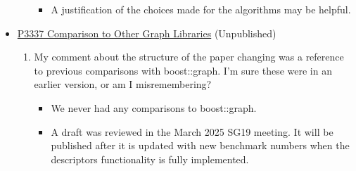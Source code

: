 \begin{itemize}
\begin{enumerate}
\begin{itemize}
\begin{itemize}
                                    \end{itemize}
                              \item A justification of the choices made for the algorithms may be helpful.
                  \end{itemize}
            \end{enumerate}
      \item \href{https://www.wg21.link/P3337}{P3337 Comparison to Other Graph Libraries} (Unpublished)
            \begin{enumerate}
                  \item My comment about the structure of the paper changing was a reference to previous comparisons with boost::graph. 
                        I'm sure these were in an earlier version, or am I misremembering?
                  \begin{itemize}
                        \item We never had any comparisons to boost::graph. 
                        \item A draft was reviewed in the March 2025 SG19 meeting. It will be published after it is updated with new
                              benchmark numbers when the descriptors functionality is fully implemented.
                  \end{itemize}
            \end{enumerate}
\end{itemize}

